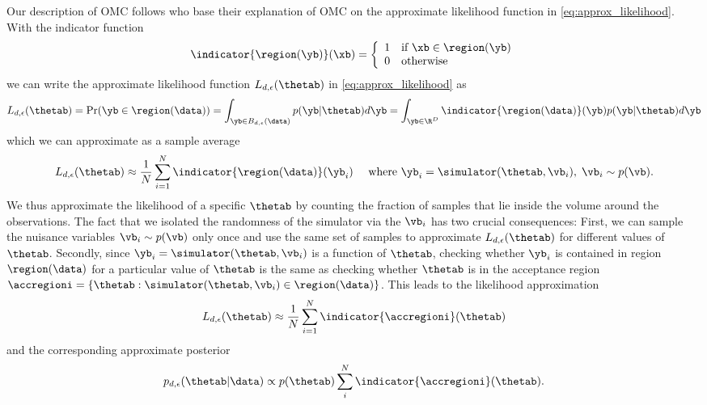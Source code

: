 Our description of OMC \citet{Meeds2015} follows \citet{Ikonomov2019}
who base their explanation of OMC on the approximate likelihood
function in \eqref{eq:approx_likelihood}. With the indicator function
%
\begin{equation} \label{eq:indicator} \indicator{\region(\yb)}(\xb)=
  \left\{
    \begin{array}{ll}
      1 & \mbox{if } \xb \in \region(\yb) \\
      0 & \mbox{otherwise} 
    \end{array} \right. \end{equation}
%
we can write the approximate likelihood function \(L_{d, \epsilon}(\thetab)\) in \eqref{eq:approx_likelihood} as
\begin{gather} \label{eq:approx_likelihood_omc}
  L_{d, \epsilon}(\thetab) = \Pr(\yb \in \region(\data)) =
  \int_{\yb \in B_{d,\epsilon}(\data)}p(\yb|\thetab)d\yb =
  \int_{\yb \in \R^D} \indicator{\region(\data)}(\yb)p(\yb|\thetab)d\yb
\end{gather}
which we can approximate as a sample average
\begin{equation}
L_{d, \epsilon}(\thetab) \approx \frac{1}{N} \sum_{i=1}^N \indicator{\region (\data)} (\yb_i)
 \quad \text{ where } \yb_i = \simulator(\thetab, \vb_i),\; \vb_i \sim p(\vb). \label{eq:alt_view}
\end{equation}
We thus approximate the likelihood of a specific \(\thetab\) by counting
the fraction of samples that lie inside the volume around the
observations. The fact that we isolated the randomness of the
simulator via the \(\vb_i\) has two crucial consequences: First, we can
sample the nuisance variables \(\vb_i \sim p(\vb)\) only once and use
the same set of samples to approximate \(L_{d,\epsilon}(\thetab)\) for
different values of \(\thetab\). Secondly, since
\(\yb_i=\simulator(\thetab, \vb_i)\) is a function of \(\thetab\),
checking whether \(\yb_i\) is contained in region \(\region (\data)\) for
a particular value of \(\thetab\) is the same as checking whether
\(\thetab\) is in the acceptance region \(\accregioni
= \{ \thetab: \simulator(\thetab, \vb_i) \in \region(\data) \}\). This
leads to the likelihood approximation
\begin{equation}
L_{d, \epsilon}(\thetab) \approx \frac{1}{N} \sum_{i=1}^N \indicator{\accregioni}(\thetab) \label{eq:alt_view_theta}
\end{equation}
and the corresponding approximate posterior
\begin{equation} \label{eq:approx_posterior_omc}
  p_{d,\epsilon}(\thetab|\data) \propto
  p(\thetab) \sum_i^N  \indicator{\accregioni}(\thetab).
\end{equation}
